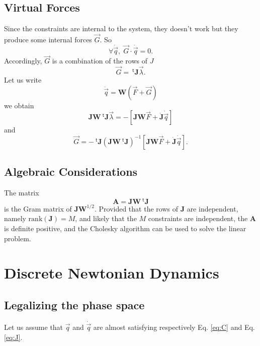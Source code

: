 \documentclass[aps,twocolumn]{revtex4}
\newcommand{\mymat}[1]{\boldsymbol{#1}}
\newcommand{\mytrn}[1]{{\!\!~^{\mathsf{t}}{#1}}}
\newcommand{\q}{\vec{q}}
\newcommand{\dq}{\dot{\q}}
\newcommand{\ddq}{\ddot{\q}}
\newcommand{\J}{\mymat{J}}
\newcommand{\dJ}{\dot{\J}}
\newcommand{\tJ}{\mytrn{\J}}
\newcommand{\G}{\vec{G}}
\newcommand{\W}{\mymat{W}}
\newcommand{\A}{\mymat{A}}
\begin{document}
\subsection{Virtual Forces}
Since the constraints are internal to the system, they doesn't work but they produce some internal
forces $\G$. So
\begin{equation}
\forall \dq, \; \G\cdot\dq = 0.
\end{equation}
Accordingly, $\G$ is a combination of the rows of $J$
\begin{equation}
	\G = \tJ \vec{\lambda}.
\end{equation}
Let us write
\begin{equation}
	\ddq = \W \left( \vec{F} + \G \right)
\end{equation}
we obtain
\begin{equation}
	\J \W \tJ \vec{\lambda} = -\left\lbrack \J\W\vec{F} + \dJ \dq \right\rbrack
\end{equation}
and
\begin{equation}
	\G = - \tJ \left(\J \W \tJ \right)^{-1}\left\lbrack \J\W\vec{F} + \dJ \dq \right\rbrack.
\end{equation}

\subsection{Algebraic Considerations}
The matrix
\begin{equation}
	\A  = \J \W \tJ 
\end{equation}
is the Gram matrix of $\J\W^{1/2}$.
Provided that the rows of $\J$ are independent, namely $\text{rank}(\J)=M$, and likely that the $M$ constraints are independent, 
the $\A$ is definite positive, and the Cholesky algorithm can be used to solve the linear problem.

\section{Discrete Newtonian Dynamics}

\subsection{Legalizing the phase space}
Let us assume that $\q$ and $\dq$ are almost satisfying respectively Eq. \eqref{eq:C} and Eq. \eqref{eq:J}.
\end{document}
